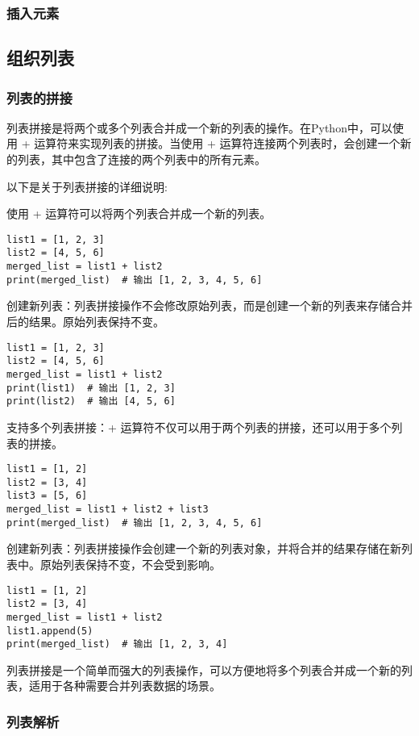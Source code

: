 \documentclass{article}
\begin{document}
\subsubsection{插入元素}
\subsection{组织列表}
\subsubsection{列表的拼接}
列表拼接是将两个或多个列表合并成一个新的列表的操作。在Python中，可以使用 + 运算符来实现列表的拼接。当使用 + 运算符连接两个列表时，会创建一个新的列表，其中包含了连接的两个列表中的所有元素。

\par 以下是关于列表拼接的详细说明:

\par 使用 + 运算符可以将两个列表合并成一个新的列表。
\begin{lstlisting}[caption={示例Python代码}]
list1 = [1, 2, 3]
list2 = [4, 5, 6]
merged_list = list1 + list2
print(merged_list)  # 输出 [1, 2, 3, 4, 5, 6]
\end{lstlisting}
创建新列表：列表拼接操作不会修改原始列表，而是创建一个新的列表来存储合并后的结果。原始列表保持不变。
\begin{lstlisting}[caption={示例Python代码}]
list1 = [1, 2, 3]
list2 = [4, 5, 6]
merged_list = list1 + list2
print(list1)  # 输出 [1, 2, 3]
print(list2)  # 输出 [4, 5, 6]
\end{lstlisting}
支持多个列表拼接：+ 运算符不仅可以用于两个列表的拼接，还可以用于多个列表的拼接。
\begin{lstlisting}[caption={示例Python代码}]
list1 = [1, 2]
list2 = [3, 4]
list3 = [5, 6]
merged_list = list1 + list2 + list3
print(merged_list)  # 输出 [1, 2, 3, 4, 5, 6]
\end{lstlisting}

创建新列表：列表拼接操作会创建一个新的列表对象，并将合并的结果存储在新列表中。原始列表保持不变，不会受到影响。
\begin{lstlisting}[caption={示例Python代码}]
list1 = [1, 2]
list2 = [3, 4]
merged_list = list1 + list2
list1.append(5)
print(merged_list)  # 输出 [1, 2, 3, 4]
\end{lstlisting}
列表拼接是一个简单而强大的列表操作，可以方便地将多个列表合并成一个新的列表，适用于各种需要合并列表数据的场景。
\subsubsection{列表解析}
\end{document}
